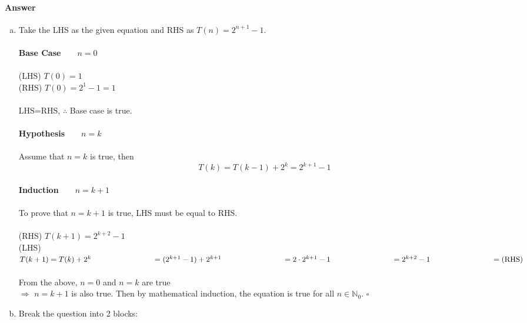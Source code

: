 \documentclass[12pt]{article}
\newcommand{\EOQ}{\hfill $\square$}
\begin{document}
\paragraph{Answer}
\begin{enumerate}[(a)]
\item Take the LHS as the given equation and RHS as $T(n)=2^{n+1}-1$.\\\\{\bf Base Case}~~~~$n=0$\\\\(LHS) $T(0)=1$\\(RHS) $T(0)=2^1-1=1$\\\\LHS=RHS, $\therefore$ Base case is true.\\\\{\bf Hypothesis}~~~~$n=k$\\\\Assume that $n=k$ is true, then\\
\begin{equation*}
T(k)=T(k-1)+2^k=2^{k+1}-1
\end{equation*}\\
{\bf Induction}~~~~$n=k+1$\\\\To prove that $n=k+1$ is true, LHS must be equal to RHS.\\\\(RHS) $T(k+1)=2^{k+2}-1$\\(LHS) $T(k+1)=T(k)+2^k\\\vspace{0.04cm}
\text{\hspace{2.83cm}}=(2^{k+1}-1)+2^{k+1}\\\vspace{0.04cm}
\text{\hspace{2.83cm}}=2\cdot 2^{k+1}-1\\\vspace{0.04cm}
\text{\hspace{2.83cm}}=2^{k+2}-1\\\vspace{0.04cm}
\text{\hspace{2.83cm}}=\text{(RHS)}$\\\\From the above, $n=0$ and $n=k$ are true \\$\Rightarrow$ $n=k+1$ is also true. Then by mathematical induction, the equation is true for all $n\in\mathbb{N}_0$.
\EOQ
\item Break the question into 2 blocks:\\\\

\end{enumerate}
\end{document}
